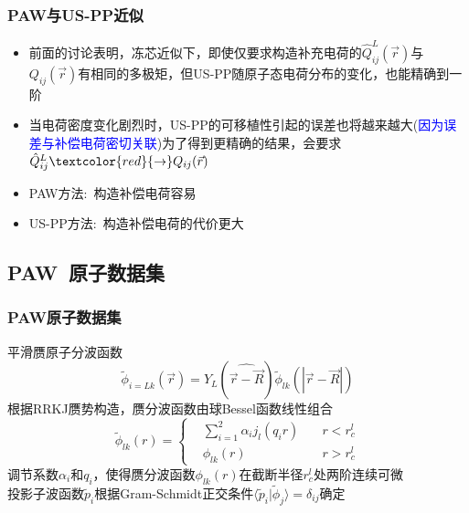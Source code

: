 {{	{\fontsize{6.5pt}{3.9pt}}
}

\frame
{
	\frametitle{\textrm{PAW}与\textrm{US-PP}近似}
	\begin{itemize}
		\item 前面的讨论表明，冻芯近似下，即使仅要求构造补充电荷的$\hat{Q}_{ij}^L(\vec r)$与$Q_{ij}(\vec r)$有相同的多极矩，但\textrm{US-PP}随原子态电荷分布的变化，也能精确到一阶\\
			{\fontsize{6.5pt}{3.9pt}}
		\item 当电荷密度变化剧烈时，\textrm{US-PP}的可移植性引起的误差也将越来越大(\textcolor{blue}{因为误差与补偿电荷密切关联})为了得到更精确的结果，会要求$\hat{Q}_{ij}^L\textcolor{red}{\rightarrow}Q_{ij}(\vec r)$\\
			{\fontsize{6.5pt}{3.9pt}}
	\end{itemize}
	\begin{itemize}
		\item \textrm{PAW}方法:~构造补偿电荷容易
			\vskip 2pt
			{\fontsize{6.5pt}{3.9pt}\selectfont{引入了全电子波函数，保持电荷密度差的精度\\
		通过电荷密度差的多极矩构造补偿电荷\\
		空间上补偿电荷更延展、更平缓}}
		\item \textrm{US-PP}方法:~构造补偿电荷的代价更大
			\vskip 2pt
			{\fontsize{6.5pt}{3.9pt}}
	\end{itemize}

}

\subsection{\rm{PAW~}原子数据集}
\frame
{
	\frametitle{\textrm{PAW}原子数据集}
	平滑赝原子分波函数
	\begin{displaymath}
		\tilde\phi_{i=Lk}(\vec r)=Y_L(\widehat{\vec r-\vec R})\tilde\phi_{lk}(|\vec r-\vec R|)
	\end{displaymath}
	根据\textrm{RRKJ}赝势构造，赝分波函数由球\textrm{Bessel}函数线性组合
	\begin{displaymath}
		\tilde\phi_{lk}(r)=\left\{
		\begin{aligned}
			&\sum_{i=1}^2\alpha_ij_l(q_ir)\quad &r<r_c^l\\
			&\phi_{lk}(r)\quad&r>r_c^l
		\end{aligned}
		\right.
	\end{displaymath}
	调节系数$\alpha_i$和$q_i$，使得赝分波函数$\phi_{lk}(r)$在截断半径$r_c^l$处两阶连续可微\\
	投影子波函数$\tilde p_i$根据\textrm{Gram-Schmidt}正交条件$\langle\tilde p_i|\tilde\phi_j\rangle=\delta_{ij}$确定
}

}
